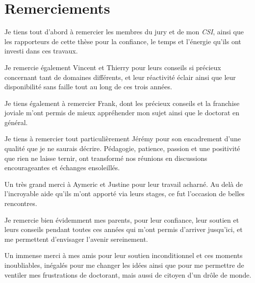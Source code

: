 \chapter*{Remerciements}
\newif\ifmerci
\mercitrue

\newcommand\merciSpace{0.25cm}

\ifmerci
Je tiens tout d'abord à remercier les membres du jury et de mon \textit{CSI}, ainsi que les rapporteurs de cette thèse pour la confiance, le temps et l'énergie qu'ils ont investi dans ces travaux.

\vspace{\merciSpace}

Je remercie également Vincent et Thierry pour leurs conseils si précieux concernant tant de domaines différents, et leur réactivité éclair ainsi que leur disponibilité sans faille tout au long de ces trois années.

\vspace{\merciSpace}

Je tiens également à remercier Frank, dont les précieux conseils et la franchise joviale m'ont permis de mieux appréhender mon sujet ainsi que le doctorat en général.

\vspace{\merciSpace}

Je tiens à remercier tout particulièrement Jérémy pour son encadrement d'une qualité que je ne saurais décrire. Pédagogie, patience, passion et une positivité que rien ne laisse ternir, ont transformé nos réunions en discussions encourageantes et échanges ensoleillés.

\vspace{\merciSpace}

Un très grand merci à Aymeric et Justine pour leur travail acharné. Au delà de l'incroyable aide qu'ils m'ont apporté via leurs stages, ce fut l'occasion de belles rencontres.

\vspace{\merciSpace}

Je remercie bien évidemment mes parents, pour leur confiance, leur soutien et leurs conseils pendant toutes ces années qui m'ont permis d'arriver jusqu'ici, et me permettent d'envisager l'avenir sereinement.

\vspace{\merciSpace}

Un immense merci à mes amis pour leur soutien inconditionnel et ces moments inoubliables, inégalés pour me changer les idées ainsi que pour me permettre de ventiler mes frustrations de doctorant, mais aussi de citoyen d'un drôle de monde.

